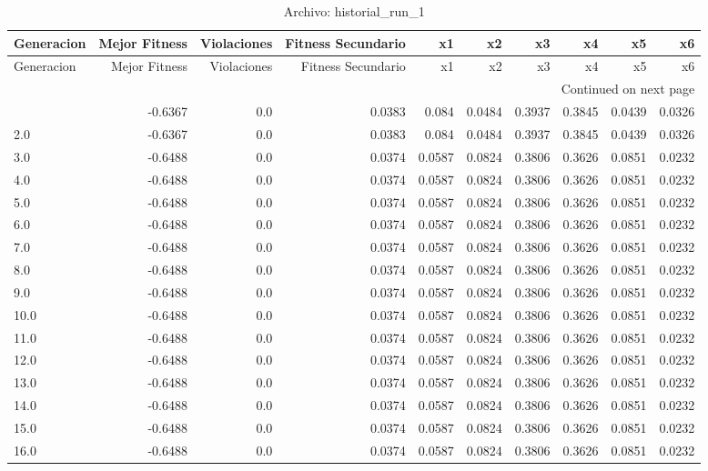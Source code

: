 \begin{longtable}{lrrrrrrrrr}
\caption{Archivo: historial\_run\_1}\label{tab:historial_run_1} \\
\toprule
Generacion & Mejor Fitness & Violaciones & Fitness Secundario & x1 & x2 & x3 & x4 & x5 & x6 \\
\midrule
\endfirsthead
\toprule
Generacion & Mejor Fitness & Violaciones & Fitness Secundario & x1 & x2 & x3 & x4 & x5 & x6 \\
\midrule
\endhead
\midrule
\multicolumn{10}{r}{Continued on next page} \\
\midrule
\endfoot
\bottomrule
\endlastfoot
1.0 & -0.6367 & 0.0 & 0.0383 & 0.084 & 0.0484 & 0.3937 & 0.3845 & 0.0439 & 0.0326 \\
2.0 & -0.6367 & 0.0 & 0.0383 & 0.084 & 0.0484 & 0.3937 & 0.3845 & 0.0439 & 0.0326 \\
3.0 & -0.6488 & 0.0 & 0.0374 & 0.0587 & 0.0824 & 0.3806 & 0.3626 & 0.0851 & 0.0232 \\
4.0 & -0.6488 & 0.0 & 0.0374 & 0.0587 & 0.0824 & 0.3806 & 0.3626 & 0.0851 & 0.0232 \\
5.0 & -0.6488 & 0.0 & 0.0374 & 0.0587 & 0.0824 & 0.3806 & 0.3626 & 0.0851 & 0.0232 \\
6.0 & -0.6488 & 0.0 & 0.0374 & 0.0587 & 0.0824 & 0.3806 & 0.3626 & 0.0851 & 0.0232 \\
7.0 & -0.6488 & 0.0 & 0.0374 & 0.0587 & 0.0824 & 0.3806 & 0.3626 & 0.0851 & 0.0232 \\
8.0 & -0.6488 & 0.0 & 0.0374 & 0.0587 & 0.0824 & 0.3806 & 0.3626 & 0.0851 & 0.0232 \\
9.0 & -0.6488 & 0.0 & 0.0374 & 0.0587 & 0.0824 & 0.3806 & 0.3626 & 0.0851 & 0.0232 \\
10.0 & -0.6488 & 0.0 & 0.0374 & 0.0587 & 0.0824 & 0.3806 & 0.3626 & 0.0851 & 0.0232 \\
11.0 & -0.6488 & 0.0 & 0.0374 & 0.0587 & 0.0824 & 0.3806 & 0.3626 & 0.0851 & 0.0232 \\
12.0 & -0.6488 & 0.0 & 0.0374 & 0.0587 & 0.0824 & 0.3806 & 0.3626 & 0.0851 & 0.0232 \\
13.0 & -0.6488 & 0.0 & 0.0374 & 0.0587 & 0.0824 & 0.3806 & 0.3626 & 0.0851 & 0.0232 \\
14.0 & -0.6488 & 0.0 & 0.0374 & 0.0587 & 0.0824 & 0.3806 & 0.3626 & 0.0851 & 0.0232 \\
15.0 & -0.6488 & 0.0 & 0.0374 & 0.0587 & 0.0824 & 0.3806 & 0.3626 & 0.0851 & 0.0232 \\
16.0 & -0.6488 & 0.0 & 0.0374 & 0.0587 & 0.0824 & 0.3806 & 0.3626 & 0.0851 & 0.0232 \\

\end{longtable}
